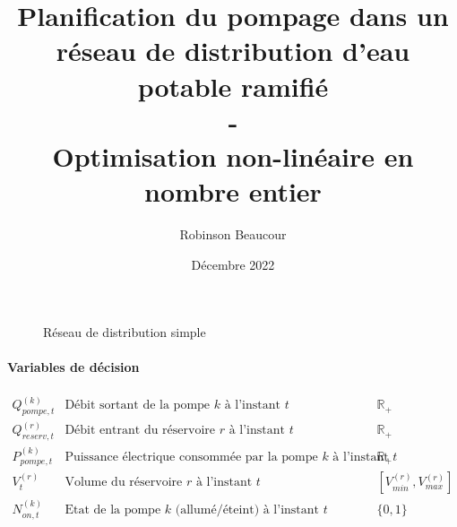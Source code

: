 \documentclass{article}
\title{Planification du pompage dans un réseau de distribution d'eau potable ramifié\\-\\Optimisation non-linéaire en nombre entier}
\author{Robinson Beaucour}
\date{Décembre 2022}
\begin{document}
\maketitle

\begin{figure}[h]
    \centering
    \caption{Réseau de distribution simple}
\end{figure}

\paragraph{Variables de décision}
$$
\left.
    \begin{array}{lll}
        Q_{pompe,t}^{(k)}       &   \text{Débit sortant de la pompe $k$ à l'instant $t$} & \mathbb{R}_+\\[0.2cm]
        Q_{reserv,t}^{(r)}      &   \text{Débit entrant du réservoire $r$ à l'instant $t$}& \mathbb{R}_+\\[0.2cm]
        P_{pompe,t}^{(k)}       &   \text{Puissance électrique consommée par la pompe $k$ à l'instant $t$}& \mathbb{R}_+\\[0.2cm]
        V_t^{(r)}               &   \text{Volume du réservoire $r$ à l'instant $t$}& [V_{min}^{(r)},V_{max}^{(r)}]\\[0.2cm]
        N_{on,t}^{(k)}          &   \text{Etat de la pompe $k$ (allumé/éteint) à l'instant $t$}&\{0,1\}\\[0.2cm]
    \end{array}
\right.
$$
\end{document}
